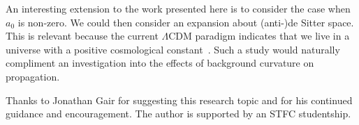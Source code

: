 \documentclass[aps,prd,amsfonts,amssymb,amsmath,nofootinbib,reprint,showpacs]{revtex4-1}
\begin{document}
An interesting extension to the work presented here is to consider the case when $a_0$ is non-zero. We could then consider an expansion about (anti-)de Sitter space. This is relevant because the current $\Lambda$CDM paradigm indicates that we live in a universe with a positive cosmological constant~\cite{Hinshaw2009}. Such a study would naturally compliment an investigation into the effects of background curvature on propagation.

\begin{acknowledgments}
Thanks to Jonathan Gair for suggesting this research topic and for his continued guidance and encouragement. The author is supported by an STFC studentship.
\end{acknowledgments}


\end{document}
